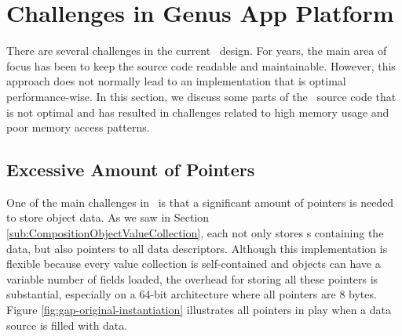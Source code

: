\section{Challenges in Genus App Platform}
\label{sec:Challenges in Genus App Platform}

There are several challenges in the current \gap~design. For years, the main area of focus has been to keep the source code readable and maintainable. However, this approach does not normally lead to an implementation that is optimal performance-wise. In this section, we discuss some parts of the \gap~source code that is not optimal and has resulted in challenges related to high memory usage and poor memory access patterns.

\subsection{Excessive Amount of Pointers}
\label{sub:Excessive Amount of Pointers}

One of the main challenges in \gap~is that a significant amount of pointers is needed to store object data. As we saw in Section \ref{sub:CompositionObjectValueCollection}, each  not only stores s containing the data, but also pointers to all data descriptors. Although this implementation is flexible because every value collection is self-contained and objects can have a variable number of fields loaded, the overhead for storing all these pointers is substantial, especially on a 64-bit architecture where all pointers are 8 bytes. Figure \ref{fig:gap-original-instantiation} illustrates all pointers in play when a data source is filled with data. 

